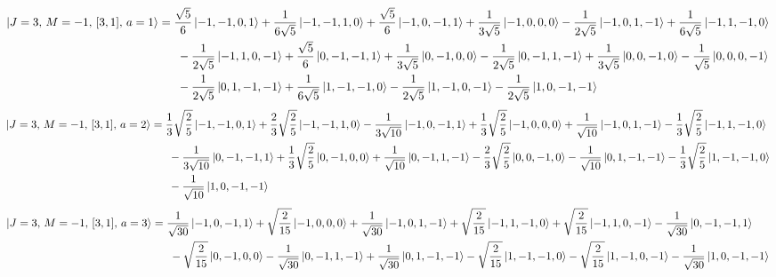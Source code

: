 \documentclass{article}
\begin{document}
{\small
\begin{equation*}
\begin{aligned}
\ket{J=3,\,M=-1,\,[3,1],\,a=1} = \; &\frac{\sqrt{5}}{6} \ket{-1,-1,0,1} + \frac{1}{6\sqrt{5}} \ket{-1,-1,1,0} + \frac{\sqrt{5}}{6} \ket{-1,0,-1,1} + \frac{1}{3\sqrt{5}} \ket{-1,0,0,0} - \frac{1}{2\sqrt{5}} \ket{-1,0,1,-1} + \frac{1}{6\sqrt{5}} \ket{-1,1,-1,0} \\
  & \; - \frac{1}{2\sqrt{5}} \ket{-1,1,0,-1} + \frac{\sqrt{5}}{6} \ket{0,-1,-1,1} + \frac{1}{3\sqrt{5}} \ket{0,-1,0,0} - \frac{1}{2\sqrt{5}} \ket{0,-1,1,-1} + \frac{1}{3\sqrt{5}} \ket{0,0,-1,0} - \frac{1}{\sqrt{5}} \ket{0,0,0,-1} \\
  & \; - \frac{1}{2\sqrt{5}} \ket{0,1,-1,-1} + \frac{1}{6\sqrt{5}} \ket{1,-1,-1,0} - \frac{1}{2\sqrt{5}} \ket{1,-1,0,-1} - \frac{1}{2\sqrt{5}} \ket{1,0,-1,-1}
\end{aligned}
\end{equation*}}
{\small
\begin{equation*}
\begin{aligned}
\ket{J=3,\,M=-1,\,[3,1],\,a=2} = \; &\frac{1}{3}\sqrt{\frac{2}{5}} \ket{-1,-1,0,1} + \frac{2}{3}\sqrt{\frac{2}{5}} \ket{-1,-1,1,0} - \frac{1}{3\sqrt{10}} \ket{-1,0,-1,1} + \frac{1}{3}\sqrt{\frac{2}{5}} \ket{-1,0,0,0} + \frac{1}{\sqrt{10}} \ket{-1,0,1,-1} - \frac{1}{3}\sqrt{\frac{2}{5}} \ket{-1,1,-1,0} \\
  & \; - \frac{1}{3\sqrt{10}} \ket{0,-1,-1,1} + \frac{1}{3}\sqrt{\frac{2}{5}} \ket{0,-1,0,0} + \frac{1}{\sqrt{10}} \ket{0,-1,1,-1} - \frac{2}{3}\sqrt{\frac{2}{5}} \ket{0,0,-1,0} - \frac{1}{\sqrt{10}} \ket{0,1,-1,-1} - \frac{1}{3}\sqrt{\frac{2}{5}} \ket{1,-1,-1,0} \\
  & \; - \frac{1}{\sqrt{10}} \ket{1,0,-1,-1}
\end{aligned}
\end{equation*}}
{\small
\begin{equation*}
\begin{aligned}
\ket{J=3,\,M=-1,\,[3,1],\,a=3} = \; &\frac{1}{\sqrt{30}} \ket{-1,0,-1,1} + \sqrt{\frac{2}{15}} \ket{-1,0,0,0} + \frac{1}{\sqrt{30}} \ket{-1,0,1,-1} + \sqrt{\frac{2}{15}} \ket{-1,1,-1,0} + \sqrt{\frac{2}{15}} \ket{-1,1,0,-1} - \frac{1}{\sqrt{30}} \ket{0,-1,-1,1} \\
  & \; - \sqrt{\frac{2}{15}} \ket{0,-1,0,0} - \frac{1}{\sqrt{30}} \ket{0,-1,1,-1} + \frac{1}{\sqrt{30}} \ket{0,1,-1,-1} - \sqrt{\frac{2}{15}} \ket{1,-1,-1,0} - \sqrt{\frac{2}{15}} \ket{1,-1,0,-1} - \frac{1}{\sqrt{30}} \ket{1,0,-1,-1}
\end{aligned}
\end{equation*}}
\end{document}
